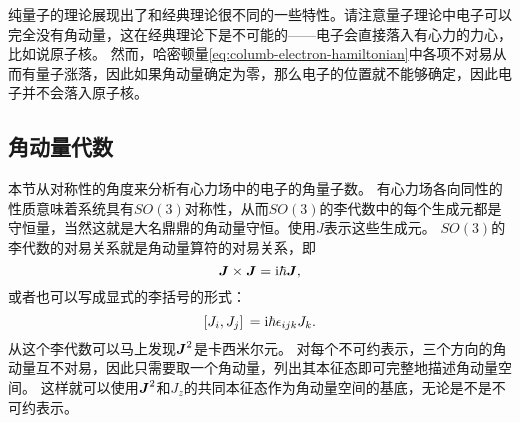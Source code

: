 纯量子的理论展现出了和经典理论很不同的一些特性。请注意量子理论中电子可以完全没有角动量，这在经典理论下是不可能的——电子会直接落入有心力的力心，比如说原子核。
然而，哈密顿量\eqref{eq:columb-electron-hamiltonian}中各项不对易从而有量子涨落，因此如果角动量确定为零，那么电子的位置就不能够确定，因此电子并不会落入原子核。

\subsection{角动量代数}\label{sec:algebra-of-angular}

本节从对称性的角度来分析有心力场中的电子的角量子数。
有心力场各向同性的性质意味着系统具有$SO(3)$对称性，从而$SO(3)$的李代数中的每个生成元都是守恒量，当然这就是大名鼎鼎的角动量守恒。使用${J}$表示这些生成元。
$SO(3)$的李代数的对易关系就是角动量算符的对易关系，即
\begin{equation}
    {\vb*{J}} \times {\vb*{J}} = \mathrm{i} \hbar {\vb*{J}},
\end{equation}
或者也可以写成显式的李括号的形式：
\begin{equation}
    \comm*{{J}_i}{{J}_j} = \ii \hbar \epsilon_{ijk} {J}_k.
\end{equation}
从这个李代数可以马上发现${\vb*{J}}^2$是卡西米尔元。
对每个不可约表示，三个方向的角动量互不对易，因此只需要取一个角动量，列出其本征态即可完整地描述角动量空间。
这样就可以使用${\vb*{J}}^2$和${J}_z$的共同本征态作为角动量空间的基底，无论是不是不可约表示。

